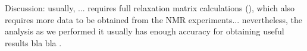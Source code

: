 


Discussion: usually, ... requires full relaxation matrix calculations (\cite{foster_mulloy_1993,mikhailov_hp_tetra_1996}), which also requires more data
to be obtained from the NMR experiments... nevertheless, the analysis as we performed it usually has enough accuracy for obtaining useful results bla bla
\cite{jones_noe_2011}.

